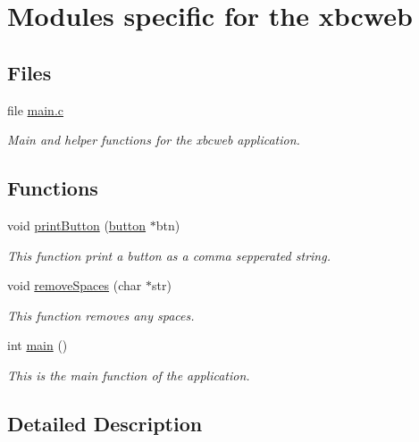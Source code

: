 \hypertarget{group__xbcweb}{\section{Modules specific for the xbcweb}
\label{group__xbcweb}
}
\subsection*{Files}
\begin{DoxyCompactItemize}
\item 
file \hyperlink{xbcweb_2main_8c}{main.\-c}
\begin{DoxyCompactList}\small\item\em Main and helper functions for the xbcweb application. \end{DoxyCompactList}\end{DoxyCompactItemize}
\subsection*{Functions}
\begin{DoxyCompactItemize}
\item 
void \hyperlink{group__xbcweb_ga7930145a568d381d1990fadbfcdf04b2}{print\-Button} (\hyperlink{structbutton}{button} $\ast$btn)
\begin{DoxyCompactList}\small\item\em This function print a button as a comma sepperated string. \end{DoxyCompactList}\item 
void \hyperlink{group__xbcweb_gae64bf1ff67dc282bbfa3a47590792c3f}{remove\-Spaces} (char $\ast$str)
\begin{DoxyCompactList}\small\item\em This function removes any spaces. \end{DoxyCompactList}\item 
int \hyperlink{group__xbcweb_gae66f6b31b5ad750f1fe042a706a4e3d4}{main} ()
\begin{DoxyCompactList}\small\item\em This is the main function of the application. \end{DoxyCompactList}\end{DoxyCompactItemize}


\subsection{Detailed Description}


